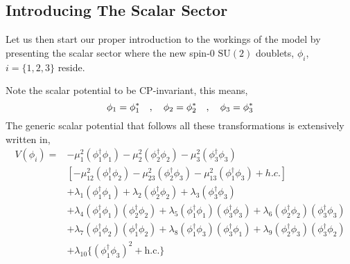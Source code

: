 \subsection{Introducing The Scalar Sector}

Let us then start our proper introduction to the workings of the model by presenting the scalar sector where the new spin-0 $\mathrm{SU(2)}$ doublets, $\phi_i$, $i=\{1,2,3\}$ reside. 
\begin{comment}
The scalar doublets are made to transform under the imposed $\mathrm{U(1)}\times \mathbb{Z}_2$ symmetries as, 
%
\begin{equation}
\begin{split}
\mathrm{U(1)} & : \phi_1 \rightarrow \phi_1 e^{i \alpha} \quad ,
            \quad \phi_3 \rightarrow \phi_3 e^{i \alpha}  \\
\mathbb{Z}_2  & : \phi_1 \rightarrow -\phi_1 \ \ \quad , 
            \quad \phi_2 \rightarrow \phi_2  \quad , 
            \quad \phi_3 \rightarrow \phi_3 \quad .
\end{split}
\end{equation}
\end{comment}
Note the scalar potential to be CP-invariant, this means,
\begin{equation}
\phi_1 = \phi_1^{\**} \quad , \quad \phi_2 = \phi_2^{\**} \quad , \quad 
\phi_3 = \phi_3^{\**} 
\end{equation}
The generic scalar potential that follows all these transformations is extensively written in, 
\begin{equation}
\label{eq:3HDM_Scalar_Pot}
\begin{split}
V(\phi_i) = & 
- \mu_1^2 \left( \phi^{\dagger}_1 \phi_1 \right) 
- \mu_2^2 \left( \phi^{\dagger}_2 \phi_2 \right)  
- \mu_3^2 \left( \phi^{\dagger}_3 \phi_3 \right) \\ 
& \left[ - \mu_{12}^2 \left( \phi^{\dagger}_1 \phi_2  \right) 
  - \mu_{23}^2 \left( \phi^{\dagger}_2 \phi_3  \right)  
  - \mu_{13}^2 \left( \phi^{\dagger}_1 \phi_3  \right) + h.c. \right]  \\
& + \lambda_1 \left( \phi^{\dagger}_1 \phi_1 \right) 
  + \lambda_2 \left( \phi^{\dagger}_2 \phi_2 \right)  
  + \lambda_3 \left( \phi^{\dagger}_3 \phi_3 \right) \\  
& + \lambda_4 \left( \phi^{\dagger}_1 \phi_1 \right)  \left( \phi^{\dagger}_2 \phi_2 \right) 
  + \lambda_5 \left( \phi^{\dagger}_1 \phi_1 \right)  \left( \phi^{\dagger}_3 \phi_3 \right)  
  + \lambda_6 \left( \phi^{\dagger}_2 \phi_2 \right)  \left( \phi^{\dagger}_3 \phi_3 \right)  \\ 
& + \lambda_7 \left( \phi^{\dagger}_1 \phi_2 \right)  \left( \phi^{\dagger}_1 \phi_2 \right)  
  + \lambda_8 \left( \phi^{\dagger}_1 \phi_3 \right)  \left( \phi^{\dagger}_3 \phi_1 \right)   
  + \lambda_9 \left( \phi^{\dagger}_2 \phi_3 \right)  \left( \phi^{\dagger}_3 \phi_2 \right)  \\
& + \lambda_{10} \Bigg\{ \left( \phi^{\dagger}_1 \phi_3 \right)^2 + \text{h.c.} \Bigg\}   
\end{split} 
\end{equation}
